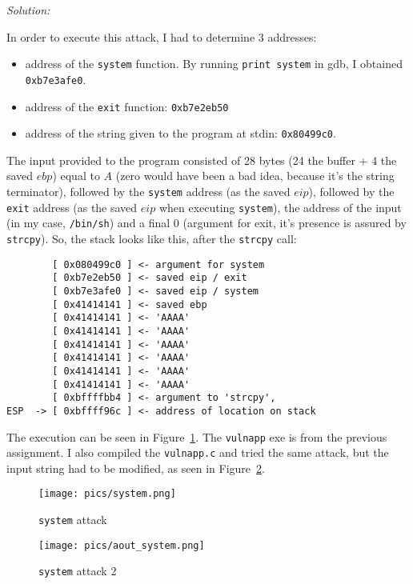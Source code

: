 \documentclass[a4paper,11pt]{article}
\newenvironment{solution}%
{\par{\noindent\small\textit{Solution:}}\vspace{-12pt}\begin{framed}}%
{\end{framed}\par}
\begin{document}
\ifsolution
\begin{solution}
In order to execute this attack, I had to determine 3 addresses:
\begin{itemize}
  \item address of the \texttt{system} function. By running \texttt{print system} in gdb, I obtained
  \texttt{0xb7e3afe0}.
  \item address of the \texttt{exit} function: \texttt{0xb7e2eb50}
  \item address of the string given to the program at stdin: \texttt{0x80499c0}.
\end{itemize}

The input provided to the program consisted of 28 bytes (24 the buffer + 4 the saved $ebp$) equal to $A$
(zero would have been a bad idea, because it's the string terminator), followed by the \texttt{system}
address (as the saved $eip$), followed by the \texttt{exit} address (as the saved $eip$ when executing
\texttt{system}), the address of the input (in my case, \texttt{/bin/sh}) and a final 0 (argument for exit, it's presence
is assured by \texttt{strcpy}). So, the stack looks like this, after the \texttt{strcpy} call:
\begin{lstlisting}
        [ 0x080499c0 ] <- argument for system
        [ 0xb7e2eb50 ] <- saved eip / exit
        [ 0xb7e3afe0 ] <- saved eip / system
        [ 0x41414141 ] <- saved ebp
        [ 0x41414141 ] <- 'AAAA'
        [ 0x41414141 ] <- 'AAAA'
        [ 0x41414141 ] <- 'AAAA'
        [ 0x41414141 ] <- 'AAAA'
        [ 0x41414141 ] <- 'AAAA'
        [ 0x41414141 ] <- 'AAAA'
        [ 0xbffffbb4 ] <- argument to 'strcpy',
ESP  -> [ 0xbffff96c ] <- address of location on stack
\end{lstlisting}

The execution can be seen in Figure~\ref{fig:system}. The \texttt{vulnapp} exe is from
the previous assignment. I also compiled the \texttt{vulnapp.c} and tried the same attack,
but the input string had to be modified, as seen in Figure~\ref{fig:aoutsystem}.

\end{solution}\fi

\begin{figure}[H] \center
  \texttt{[image: pics/system.png]}
  \caption{\texttt{system} attack}
  \label{fig:system}
\end{figure}

\begin{figure}[H] \center
  \texttt{[image: pics/aout\_system.png]}
  \caption{\texttt{system} attack 2}
  \label{fig:aoutsystem}
\end{figure}
\end{document}

